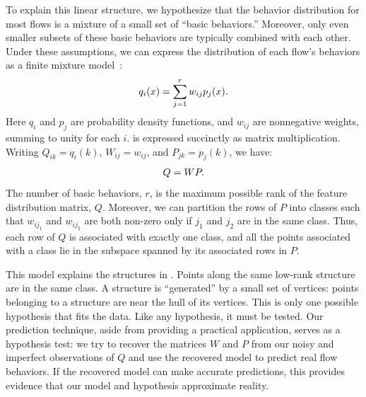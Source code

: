 \documentclass{acm_proc_article-sp}
\begin{document}
To explain this linear structure, we hypothesize that the behavior distribution for most flows is a mixture of a small set of ``basic behaviors.''
Moreover, only even smaller subsets of these basic behaviors are typically combined with each other.
Under these assumptions, we can express the distribution of each flow's behaviors as a finite mixture model~\cite{McLachlan00}:
\begin{align}\eqn{mixture-model}
  q_i(x) = \sum_{j=1}^r w_{ij} p_j(x).
\end{align}
Here $q_i$ and $p_j$ are probability density functions, and $w_{ij}$ are nonnegative weights, summing to unity for each $i$.
 is expressed succinctly as matrix multiplication.
Writing $Q_{ik} = q_i(k)$, $W_{ij} = w_{ij}$, and $P_{jk} = p_j(k)$, we have:
\begin{align}\eqn{mixture-model-matrix}
  Q = WP.
\end{align}
The number of basic behaviors, $r$, is the maximum possible rank of the feature distribution matrix, $Q$.
Moreover, we can partition the rows of $P$ into classes such that $w_{ij_1}$ and $w_{ij_2}$ are both non-zero only if $j_1$ and $j_2$ are in the same class.
Thus, each row of $Q$ is associated with exactly one class, and all the points associated with a class lie in the subspace spanned by its associated rows in $P$.

This model explains the structures in .
Points along the same low-rank structure are in the same class.
A structure is ``generated'' by a small set of vertices:
points belonging to a structure are near the hull of its vertices.
This is only one possible hypothesis that fits the data.
Like any hypothesis, it must be tested.
Our prediction technique, aside from providing a practical application, serves as a hypothesis test:
we try to recover the matrices $W$ and $P$ from our noisy and imperfect observations of $Q$ and use the recovered model to predict real flow behaviors.
If the recovered model can make accurate predictions, this provides evidence that our model and hypothesis approximate reality.

\end{document}
